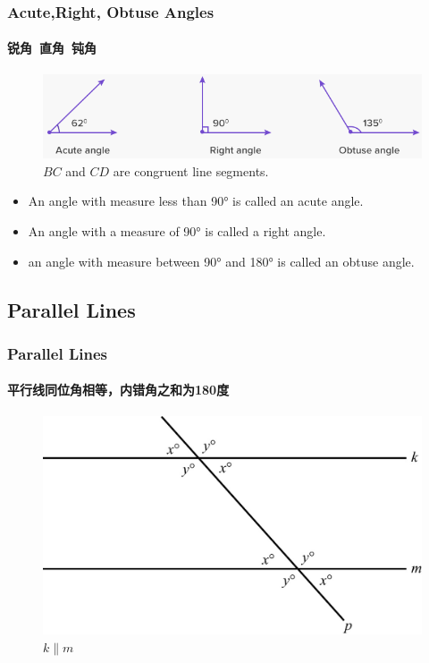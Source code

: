 \documentclass[
	11pt, %
	handout,
]{beamer}
\begin{document}
\begin{frame}
	\frametitle{Acute,Right, Obtuse Angles} %
	\framesubtitle{锐角\ 直角\ 钝角}

		\begin{figure}
			\includegraphics[width=\linewidth]{Acute_Right_Obtuse.png}
			\caption{$BC$ and $CD$ are congruent line segments.}
		\end{figure}

		\begin{definition}
		\begin{itemize}
			\item An angle with measure less than 90° is called an \alert{acute angle}.
			\item An angle with a measure of 90° is called a \alert{right angle}.
			\item an angle with measure between 90° and 180° is called an \alert{obtuse angle}.
		\end{itemize}
		\end{definition}
\end{frame}


\subsection{Parallel Lines}


\begin{frame}
	\frametitle{Parallel Lines} %
	\framesubtitle{平行线同位角相等，内错角之和为180度}
		\begin{figure}
			\includegraphics[width=0.9\linewidth]{Parallel_Lines.jpg}
			\caption{$k \parallel m$}
		\end{figure}
\end{frame}
\end{document}
